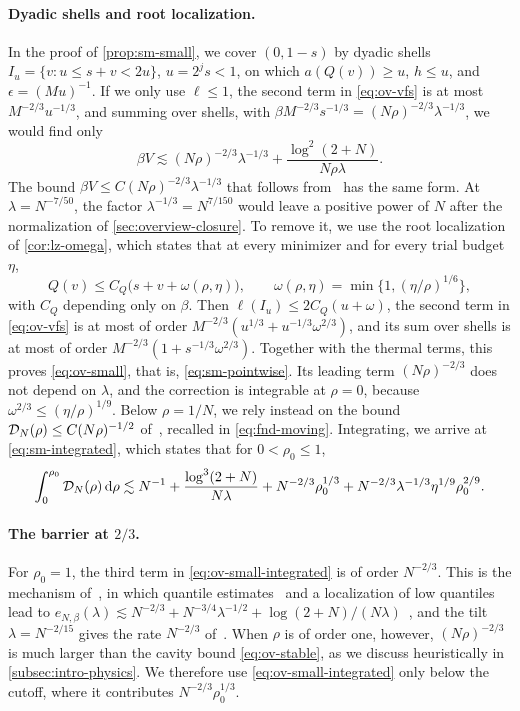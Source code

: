 \paragraph{Dyadic shells and root localization.}
In the proof of \cref{prop:sm-small}, we cover $(0,1-s)$ by dyadic
shells $I_u=\{v:u\le s+v<2u\}$, $u=2^js<1$, on which $a(Q(v))\ge u$,
$h\le u$, and $\epsilon=(Mu)^{-1}$. If we only use $\ell\le1$, the second
term in \eqref{eq:ov-vfs} is at most $M^{-2/3}u^{-1/3}$, and summing over
shells, with $\beta M^{-2/3}s^{-1/3}=(N\rho)^{-2/3}\lambda^{-1/3}$, we
would find only
\[
 \beta V\lesssim(N\rho)^{-2/3}\lambda^{-1/3}
 +\frac{\log^2(2+N)}{N\rho\lambda}.
\]
The bound $\beta V\le C(N\rho)^{-2/3}\lambda^{-1/3}$ that follows
from~\cite[(4.2)]{AL} has the same form. At $\lambda=N^{-7/50}$, the
factor $\lambda^{-1/3}=N^{7/150}$ would leave a positive power of $N$
after the normalization of \cref{sec:overview-closure}. To remove it, we
use the root localization of \cref{cor:lz-omega}, which states that at
every minimizer and for every trial budget $\eta$,
\[
 Q(v)\le C_Q\bigl(s+v+\omega(\rho,\eta)\bigr),\qquad
 \omega(\rho,\eta)=\min\{1,(\eta/\rho)^{1/6}\},
\]
with $C_Q$ depending only on $\beta$. Then
$\ell(I_u)\le2C_Q(u+\omega)$, the second term in \eqref{eq:ov-vfs} is
at most of order $M^{-2/3}(u^{1/3}+u^{-1/3}\omega^{2/3})$,
and its sum over shells is at most of order $M^{-2/3}(1+s^{-1/3}\omega^{2/3})$.
Together with the thermal terms, this proves \eqref{eq:ov-small}, that
is, \eqref{eq:sm-pointwise}. Its leading term $(N\rho)^{-2/3}$ does not
depend on $\lambda$, and the correction is integrable at $\rho=0$,
because $\omega^{2/3}\le(\eta/\rho)^{1/9}$. Below $\rho=1/N$, we rely
instead on the bound $\mathcal D_N(\rho)\le C(N\rho)^{-1/2}$
of~\cite[Lemma~4.1]{AL}, recalled in \eqref{eq:fnd-moving}. Integrating,
we arrive at \eqref{eq:sm-integrated}, which states that for
$0<\rho_0\le1$,
\begin{equation}\label{eq:ov-small-integrated}
 \int_0^{\rho_0}\mathcal D_N(\rho)\,\mathrm d\rho
 \lesssim N^{-1}+\frac{\log^3(2+N)}{N\lambda}
 +N^{-2/3}\rho_0^{1/3}
 +N^{-2/3}\lambda^{-1/3}\eta^{1/9}\rho_0^{2/9}.
\end{equation}

\paragraph{\texorpdfstring{The barrier at $2/3$.}{The barrier at 2/3.}}
For $\rho_0=1$, the third term in \eqref{eq:ov-small-integrated} is of
order $N^{-2/3}$. This is the mechanism of~\cite[Proposition~7.7]{AL},
in which quantile estimates~\cite[Lemma~3.3]{AL} and a localization of
low quantiles~\cite[Lemma~7.6]{AL} lead to
$e_{N,\beta}(\lambda)\lesssim N^{-2/3}+N^{-3/4}\lambda^{-1/2}
+\log(2+N)/(N\lambda)$~\cite[(7.43)]{AL}, and the tilt
$\lambda=N^{-2/15}$ gives the rate $N^{-2/3}$
of~\cite[Theorem~1.4]{AL}. When $\rho$ is of order one, however,
$(N\rho)^{-2/3}$ is much larger than the cavity bound
\eqref{eq:ov-stable}, as we discuss heuristically in
\cref{subsec:intro-physics}. We therefore use
\eqref{eq:ov-small-integrated} only below the cutoff, where it
contributes $N^{-2/3}\rho_0^{1/3}$.

